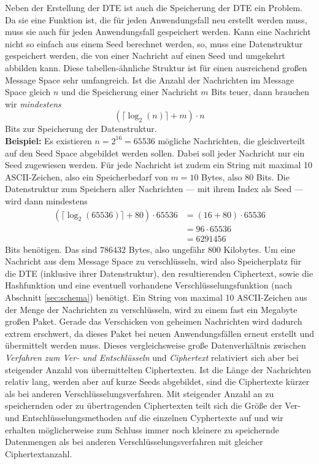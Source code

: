 Neben der Erstellung der DTE ist auch die Speicherung der DTE ein Problem. Da sie eine Funktion ist, die für jeden Anwendungsfall neu erstellt werden muss, muss sie auch für jeden Anwendungsfall gespeichert werden. Kann eine Nachricht nicht so einfach aus einem Seed berechnet werden, so, muss eine Datenstruktur gespeichert werden, die von einer Nachricht auf einen Seed und umgekehrt abbilden kann. Diese tabellen-ähnliche Struktur ist für einen ausreichend großen Message Space sehr umfangreich. Ist die Anzahl der Nachrichten im Message Space gleich $n$ und die Speicherung einer Nachricht $m$ Bits teuer, dann brauchen wir \emph{mindestens}
$$(\lceil\log_2(n)\rceil + m) \cdot n$$
Bits zur Speicherung der Datenstruktur.\\
\textbf{Beispiel:} Es existieren $n = 2^{16} = 65536$ mögliche Nachrichten, die gleichverteilt auf den Seed Space abgebildet werden sollen. Dabei soll jeder Nachricht nur ein Seed zugewiesen werden. Für jede Nachricht ist zudem ein String mit maximal 10 ASCII-Zeichen, also ein Speicherbedarf von $m = 10$ Bytes, also $80$ Bits. Die Datenstruktur zum Speichern aller Nachrichten --- mit ihrem Index als Seed --- wird dann mindestens
\begin{align*}
(\lceil\log_2(65536)\rceil + 80) \cdot 65536 &= (16 + 80) \cdot 65536\\
&= 96 \cdot 65536\\
&= 6 291 456
\end{align*}
Bits benötigen. Das sind $786 432$ Bytes, also ungefähr 800 Kilobytes. Um eine Nachricht aus dem Message Space zu verschlüsseln, wird also Speicherplatz für die DTE (inklusive ihrer Datenstruktur), den resultierenden Ciphertext, sowie die Hashfunktion und eine eventuell vorhandene Verschlüsselungsfunktion (nach Abschnitt \ref{sec:schema}) benötigt. Ein String von maximal 10 ASCII-Zeichen aus der Menge der Nachrichten zu verschlüsseln, wird zu einem fast ein Megabyte großen Paket. Gerade das Verschicken von geheimen Nachrichten wird dadurch extrem erschwert, da dieses Paket bei neuen Anwendungsfällen erneut erstellt und übermittelt werden muss. Dieses vergleichsweise große Datenverhältnis zwischen \emph{Verfahren zum Ver- und Entschlüsseln} und \emph{Ciphertext} relativiert sich aber bei steigender Anzahl von übermittelten Ciphertexten. Ist die Länge der Nachrichten relativ lang, werden aber auf kurze Seeds abgebildet, sind die Ciphertexte kürzer als bei anderen Verschlüsselungsverfahren. Mit steigender Anzahl an zu speichernden oder zu übertragenden Ciphertexten teilt sich die Größe der Ver- und Entschlüsselungsmethoden auf die einzelnen Cyphertexte auf und wir erhalten möglicherweise zum Schluss immer noch kleinere zu speichernde Datenmengen als bei anderen Verschlüsselungsverfahren mit gleicher Ciphertextanzahl.

